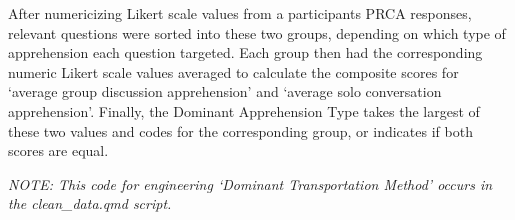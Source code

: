 \documentclass[
  11pt,
  letterpaper,
]{article}
\begin{document}
After numericizing Likert scale values from a participants PRCA
responses, relevant questions were sorted into these two groups,
depending on which type of apprehension each question targeted. Each
group then had the corresponding numeric Likert scale values averaged to
calculate the composite scores for `average group discussion
apprehension' and `average solo conversation apprehension'. Finally, the
Dominant Apprehension Type takes the largest of these two values and
codes for the corresponding group, or indicates if both scores are
equal.

\emph{NOTE: This code for engineering `Dominant Transportation Method'
occurs in the clean\_data.qmd script.}
\end{document}
